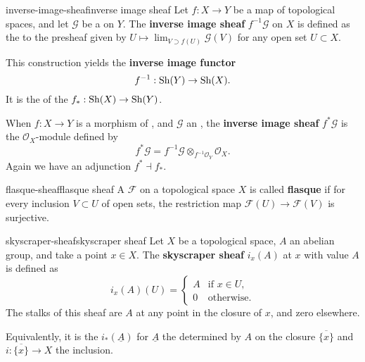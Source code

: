 \begin{topic}{inverse-image-sheaf}{inverse image sheaf}
    Let $f : X \to Y$ be a map of topological spaces, and let $\mathcal{G}$ be a  on $Y$. The \textbf{inverse image sheaf} $f^
    {-1}\mathcal{G}$ on $X$ is defined as the  to the presheaf given by $U \mapsto \lim_{V \supset f(U)} \mathcal{G}(V)$ for any open set $U \subset X$.
    
    This construction yields the \textbf{inverse image functor}
    \[ f^{-1} : \textup{Sh}(Y) \to \textup{Sh}(X) . \]
    It is the  of the  $f_* : \textup{Sh}(X) \to \textup{Sh}(Y)$.
    
    When $f : X \to Y$ is a morphism of , and $\mathcal{G}$ an , the \textbf{inverse image sheaf} $f^* \mathcal{G}$ is the $\mathcal{O}_X$-module defined by
    \[ f^* \mathcal{G} = f^{-1} \mathcal{G} \otimes_{f^{-1} \mathcal{O}_Y} \mathcal{O}_X . \]
    Again we have an adjunction $f^* \dashv f_*$.
\end{topic}

\begin{topic}{flasque-sheaf}{flasque sheaf}
    A  $\mathcal{F}$ on a topological space $X$ is called \textbf{flasque} if for every inclusion $V \subset U$ of open sets, the restriction map $\mathcal{F}(U) \to \mathcal{F}(V)$ is surjective.
\end{topic}

\begin{topic}{skyscraper-sheaf}{skyscraper sheaf}
    Let $X$ be a topological space, $A$ an abelian group, and take a point $x \in X$. The \textbf{skyscraper sheaf} $i_x(A)$ at $x$ with value $A$ is defined as
    \[ i_x(A) (U) = \left\{ \begin{array}{cl} A & \text{if } x \in U, \\ 0 & \text{otherwise.} \end{array} \right. \]
    The stalks of this sheaf are $A$ at any point in the closure of $x$, and zero elsewhere.
    
    Equivalently, it is the  $i_*(\underline{A})$ for $\underline{A}$ the  determined by $A$ on the closure $\overline{\{ x \}}$ and $i : \overline{\{ x \}} \to X$ the inclusion.
\end{topic}

